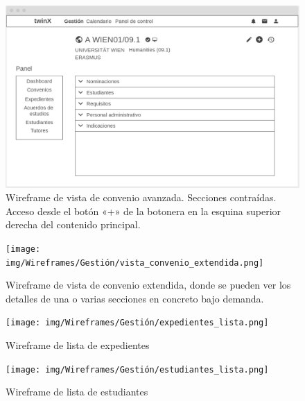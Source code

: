\begin{figure}
	\centering
	\includegraphics[width=\textwidth]{img/Wireframes/Gestión/vista_convenio_avanzada_contraída.png}
	\caption[Wireframe de vista de convenio avanzada]{Wireframe de vista de convenio avanzada. Secciones contraídas. Acceso desde el botón «+» de la botonera en la esquina superior derecha del contenido principal.}
	\label{fig:vista_conv_avanzada_contWF}
\end{figure}

\begin{figure}
	\centering
	\texttt{[image: img/Wireframes/Gestión/vista\_convenio\_extendida.png]}
	\caption[Wireframe de vista de convenio extendida]{Wireframe de vista de convenio extendida, donde se pueden ver los detalles de una o varias secciones en concreto bajo demanda.}
	\label{fig:vista_conv_extendidaWF}
\end{figure}

\begin{figure}
	\centering
	\texttt{[image: img/Wireframes/Gestión/expedientes\_lista.png]}
	\caption{Wireframe de lista de expedientes}
	\label{fig:expedientes_listaWF}
\end{figure}

\begin{figure}
	\centering
	\texttt{[image: img/Wireframes/Gestión/estudiantes\_lista.png]}
	\caption{Wireframe de lista de estudiantes}
	\label{fig:estudiantes_listaWF}
\end{figure}

